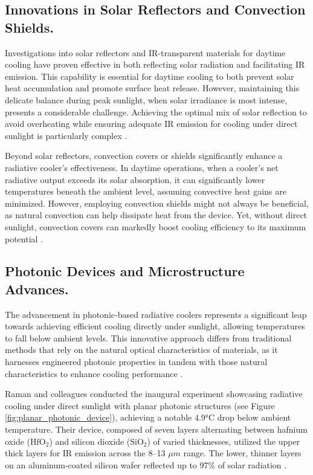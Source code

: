 \subsection{Innovations in Solar Reflectors and Convection Shields.}
Investigations into solar reflectors and IR-transparent materials for daytime cooling have proven effective in both reflecting solar radiation and facilitating IR emission. This capability is essential for daytime cooling to both prevent solar heat accumulation and promote surface heat release. However, maintaining this delicate balance during peak sunlight, when solar irradiance is most intense, presents a considerable challenge. Achieving the optimal mix of solar reflection to avoid overheating while ensuring adequate IR emission for cooling under direct sunlight is particularly complex \cite{hossain_radiative_2016}.

Beyond solar reflectors, convection covers or shields significantly enhance a radiative cooler's effectiveness. In daytime operations, when a cooler's net radiative output exceeds its solar absorption, it can significantly lower temperatures beneath the ambient level, assuming convective heat gains are minimized. However, employing convection shields might not always be beneficial, as natural convection can help dissipate heat from the device. Yet, without direct sunlight, convection covers can markedly boost cooling efficiency to its maximum potential \cite{hossain_radiative_2016}.

\subsection{Photonic Devices and Microstructure Advances.}
The advancement in photonic-based radiative coolers represents a significant leap towards achieving efficient cooling directly under sunlight, allowing temperatures to fall below ambient levels. This innovative approach differs from traditional methods that rely on the natural optical characteristics of materials, as it harnesses engineered photonic properties in tandem with those natural characteristics to enhance cooling performance \cite{hossain_radiative_2016}.

Raman and colleagues conducted the inaugural experiment showcasing radiative cooling under direct sunlight with planar photonic structures (see Figure \ref{fig:planar_photonic_device}), achieving a notable 4.9°C drop below ambient temperature. Their device, composed of seven layers alternating between hafnium oxide ($\text{HfO}_2$) and silicon dioxide ($\text{SiO}_2$) of varied thicknesses, utilized the upper thick layers for IR emission across the 8–13 $\mu m$ range. The lower, thinner layers on an aluminum-coated silicon wafer reflected up to 97\% of solar radiation \cite{raman_passive_2014}.

